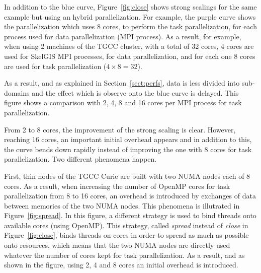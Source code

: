 In addition to the blue curve, Figure~\ref{fig:close} shows strong scalings for the same example but using an hybrid parallelization. For example, the purple curve shows the parallelization which uses 8 cores, to perform the task parallelization, for each process used for data parallelization (\ie MPI process). As a result, for example, when using 2 machines of the TGCC cluster, with a total of 32 cores, 4 cores are used for SkelGIS MPI processes, for data parallelization, and for each one 8 cores are used for task parallelization ($4 \times 8 = 32$).

As a result, and as explained in Section~\ref{sect:perfs}, data is less divided into sub-domains and the effect which is observe onto the blue curve is delayed. This figure shows a comparison with 2, 4, 8 and 16 cores per MPI process for task parallelization.

From 2 to 8 cores, the improvement of the strong scaling is clear. However, reaching 16 cores, an important initial overhead appears and in addition to this, the curve bends down rapidly instead of improving the one with 8 cores for task parallelization. Two different phenomena happen.

First, thin nodes of the TGCC Curie are built with two NUMA nodes each of 8 cores. As a result, when increasing the number of OpenMP cores for task parallelization from 8 to 16 cores, an overhead is introduced by exchanges of data between memories of the two NUMA nodes. This phenomena is illutrated in Figure~\ref{fig:spread}. In this figure, a different strategy is used to bind threads onto available cores (using OpenMP). This strategy, called \emph{spread} instead of \emph{close} in Figure~\ref{fig:close}, binds threads on cores in order to spread as much as possible onto resources, which means that the two NUMA nodes are directly used whatever the number of cores kept for task parallelization. As a result, and as shown in the figure, using 2, 4 and 8 cores an initial overhead is introduced.

